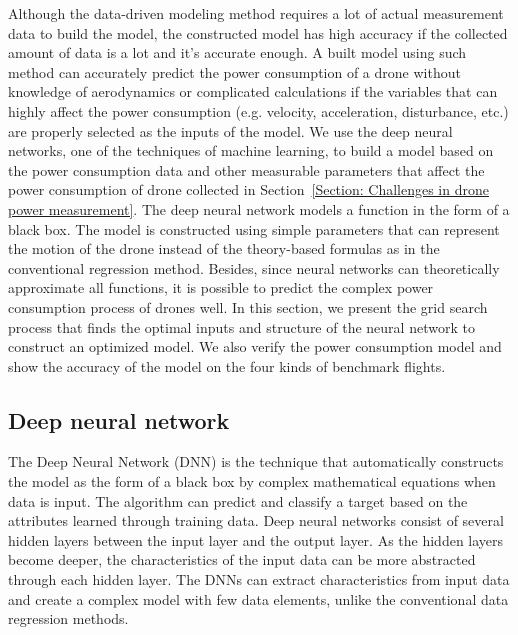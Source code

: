 \documentclass[journal]{./template/IEEEtran}
\begin{document}
Although the data-driven modeling method requires a lot of actual measurement data to build the model, the constructed model has high accuracy if the collected amount of data is a lot and it's accurate enough.
A built model using such method can accurately predict the power consumption of a drone without knowledge of aerodynamics or complicated calculations if the variables that can highly affect the power consumption (e.g. velocity, acceleration, disturbance, etc.) are properly selected as the inputs of the model.
We use the deep neural networks, one of the techniques of machine learning, to build a model based on the power consumption data and other measurable parameters that affect the power consumption of drone collected in Section~\ref{Section: Challenges in drone power measurement}.
The deep neural network models a function in the form of a black box. The model is constructed using simple parameters that can represent the motion of the drone instead of the theory-based formulas as in the conventional regression method. 
Besides, since neural networks can theoretically approximate all functions, it is possible to predict the complex power consumption process of drones well.
In this section, we present the grid search process that finds the optimal inputs and structure of the neural network to construct an optimized model. 
We also verify the power consumption model and show the accuracy of the model on the four kinds of benchmark flights.





\subsection{Deep neural network}
The Deep Neural Network (DNN) is the technique that automatically constructs the model as the form of a black box by complex mathematical equations when data is input.
The algorithm can predict and classify a target based on the attributes learned through training data. 
Deep neural networks consist of several hidden layers between the input layer and the output layer.
As the hidden layers become deeper, the characteristics of the input data can be more abstracted through each hidden layer.
The DNNs can extract characteristics from input data and create a complex model with few data elements, unlike the conventional data regression methods.
\end{document}
